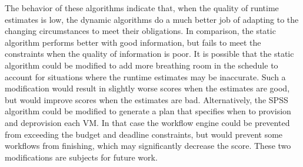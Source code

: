 \documentclass[conference]{IEEEtran}
\begin{document}

The behavior of these algorithms indicate that, when the quality of runtime estimates is low, the dynamic algorithms do a much better job of adapting to the changing circumstances to meet their obligations. In comparison, the static algorithm performs better with good information, but fails to meet the constraints when the quality of information is poor. It is possible that the static algorithm could be modified to add more breathing room in the schedule to account for situations where the runtime estimates may be inaccurate. Such a modification would result in slightly worse scores when the estimates are good, but would improve scores when the estimates are bad. Alternatively, the SPSS algorithm could be modified to generate a plan that specifies when to provision and deprovision each VM. In that case the workflow engine could be prevented from exceeding the budget and deadline constraints, but would prevent some workflows from finishing, which may significantly decrease the score. These two modifications are subjects for future work.
\end{document}
